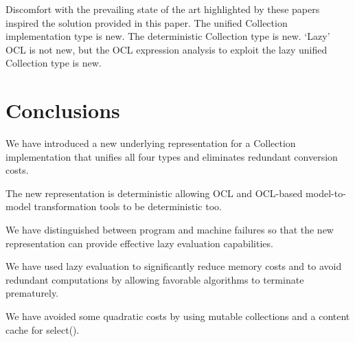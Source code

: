 \documentclass{llncs}
\begin{document}
Discomfort with the prevailing state of the art highlighted by these papers inspired the solution provided in this paper. The unified Collection implementation type is new. The deterministic Collection type is new. `Lazy' OCL is not new, but the OCL expression analysis to exploit the lazy unified Collection type is new.
%
\section{Conclusions}\label{Conclusions}
%
We have introduced a new underlying representation for a Collection implementation that unifies all four types and eliminates redundant conversion costs.

The new representation is deterministic allowing OCL and OCL-based model-to-model transformation tools to be deterministic too.

We have distinguished between program and machine failures so that the new representation can provide effective lazy evaluation capabilities.

We have used lazy evaluation to significantly reduce memory costs and to avoid redundant computations by allowing favorable algorithms to terminate prematurely.

We have avoided some quadratic costs by using mutable collections and a content cache for select().
  

\end{document}
